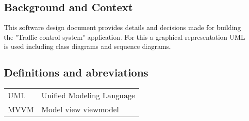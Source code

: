 \documentclass[a4paper,11pt]{article}
\title{\Title}
\author{}
\date{\today}
\begin{document}
\begin{titlepage}
\maketitle
\end{titlepage}

  	\linespread{1.15} %
    
  	\subsection*{Background and Context}
  	This software design document provides details and decisions made for building the "Traffic control system" application. For this a graphical representation UML is used including class diagrams and sequence diagrams.
  	
  	\subsection*{Definitions and abreviations}
  	\begin{longtable}[l]{p{80pt} p{350pt}} 
  		UML & Unified Modeling Language\\
  		MVVM & Model view viewmodel\\
  	\end{longtable}
  	
  	\tableofcontents
 
  	\newpage
  	
  	
  	
  	
    
    
\end{document}
